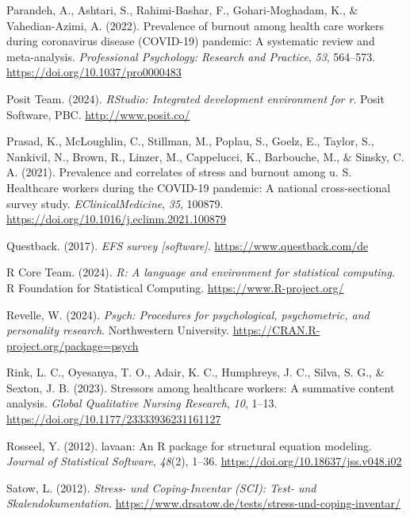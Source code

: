 \documentclass[
  english,
  man]{apa6}
\newlength{\cslhangindent}
\newenvironment{CSLReferences}[2] %
 {\begin{list}{}{%
  \setlength{\itemindent}{0pt}
  \setlength{\leftmargin}{0pt}
  \setlength{\parsep}{0pt}
  \ifodd #1
   \setlength{\leftmargin}{\cslhangindent}
   \setlength{\itemindent}{-1\cslhangindent}
  \fi
  \setlength{\itemsep}{#2\baselineskip}}}
 {\end{list}}
\begin{document}
\begin{CSLReferences}{1}{0}
Parandeh, A., Ashtari, S., Rahimi-Bashar, F., Gohari-Moghadam, K., \& Vahedian-Azimi, A. (2022). Prevalence of burnout among health care workers during coronavirus disease ({COVID-19}) pandemic: A systematic review and meta-analysis. \emph{Professional Psychology: Research and Practice}, \emph{53}, 564--573. \url{https://doi.org/10.1037/pro0000483}

Posit Team. (2024). \emph{RStudio: Integrated development environment for r}. Posit Software, PBC. \url{http://www.posit.co/}

Prasad, K., McLoughlin, C., Stillman, M., Poplau, S., Goelz, E., Taylor, S., Nankivil, N., Brown, R., Linzer, M., Cappelucci, K., Barbouche, M., \& Sinsky, C. A. (2021). Prevalence and correlates of stress and burnout among u. S. Healthcare workers during the COVID-19 pandemic: A national cross-sectional survey study. \emph{EClinicalMedicine}, \emph{35}, 100879. \url{https://doi.org/10.1016/j.eclinm.2021.100879}

Questback. (2017). \emph{EFS survey {[}software{]}}. \url{https://www.questback.com/de}

R Core Team. (2024). \emph{R: A language and environment for statistical computing}. R Foundation for Statistical Computing. \url{https://www.R-project.org/}

Revelle, W. (2024). \emph{Psych: Procedures for psychological, psychometric, and personality research}. Northwestern University. \url{https://CRAN.R-project.org/package=psych}

Rink, L. C., Oyesanya, T. O., Adair, K. C., Humphreys, J. C., Silva, S. G., \& Sexton, J. B. (2023). Stressors among healthcare workers: A summative content analysis. \emph{Global Qualitative Nursing Research}, \emph{10}, 1--13. \url{https://doi.org/10.1177/23333936231161127}

Rosseel, Y. (2012). {lavaan}: An {R} package for structural equation modeling. \emph{Journal of Statistical Software}, \emph{48}(2), 1--36. \url{https://doi.org/10.18637/jss.v048.i02}

Satow, L. (2012). \emph{{Stress- und Coping-Inventar (SCI): Test- und Skalendokumentation}}. \url{https://www.drsatow.de/tests/stress-und-coping-inventar/}


\end{CSLReferences}
\end{document}
